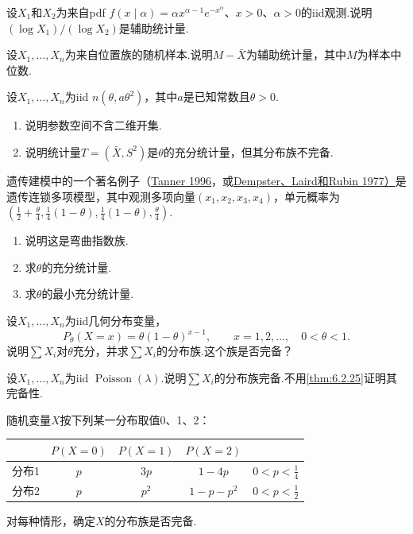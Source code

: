 \begin{exercise}\label{exercise:6.13}
设$X_1$和$X_2$为来自pdf $f(x\mid\alpha)=\alpha x^{\alpha-1}e^{-x^\alpha}$、$x>0$、$\alpha>0$的iid观测.说明$(\log X_1)/(\log X_2)$是辅助统计量.
\end{exercise}
\begin{exercise}\label{exercise:6.14}
设$X_1,\ldots,X_n$为来自位置族的随机样本.说明$M-\bar X$为辅助统计量，其中$M$为样本中位数.
\end{exercise}
\begin{exercise}\label{exercise:6.15}
设$X_1,\ldots,X_n$为iid $n(\theta,a\theta^2)$，其中$a$是已知常数且$\theta>0$.
\begin{enumerate}[label=(\alph*)]
\item 说明参数空间不含二维开集.
\item 说明统计量$T=(\bar X,S^2)$是$\theta$的充分统计量，但其分布族不完备.
\end{enumerate}
\end{exercise}
\begin{exercise}\label{exercise:6.16}
遗传建模中的一个著名例子（\hyperref[bib:source312]{Tanner 1996}，或\hyperref[bib:source97]{Dempster、Laird和Rubin 1977）}是遗传连锁多项模型，其中观测多项向量$(x_1,x_2,x_3,x_4)$，单元概率为$(\tfrac12+\tfrac\theta4,\tfrac14(1-\theta),\tfrac14(1-\theta),\tfrac\theta4)$.
\begin{enumerate}[label=(\alph*)]
\item 说明这是弯曲指数族.
\item 求$\theta$的充分统计量.
\item 求$\theta$的最小充分统计量.
\end{enumerate}
\end{exercise}
\begin{exercise}\label{exercise:6.17}
设$X_1,\ldots,X_n$为iid几何分布变量，
$$P_\theta(X=x)=\theta(1-\theta)^{x-1},\qquad x=1,2,\ldots,\quad0<\theta<1.$$
说明$\sum X_i$对$\theta$充分，并求$\sum X_i$的分布族.这个族是否完备？
\end{exercise}
\begin{exercise}\label{exercise:6.18}
设$X_1,\ldots,X_n$为iid $\operatorname{Poisson}(\lambda)$.说明$\sum X_i$的分布族完备.不用\autoref{thm:6.2.25}证明其完备性.
\end{exercise}
\begin{exercise}\label{exercise:6.19}
随机变量$X$按下列某一分布取值0、1、2：
\begin{center}
\begin{tabular}{lcccc}
&$P(X=0)$&$P(X=1)$&$P(X=2)$&\\\hline
分布1&$p$&$3p$&$1-4p$&$0<p<\tfrac14$\\
分布2&$p$&$p^2$&$1-p-p^2$&$0<p<\tfrac12$
\end{tabular}
\end{center}
对每种情形，确定$X$的分布族是否完备.
\end{exercise}
